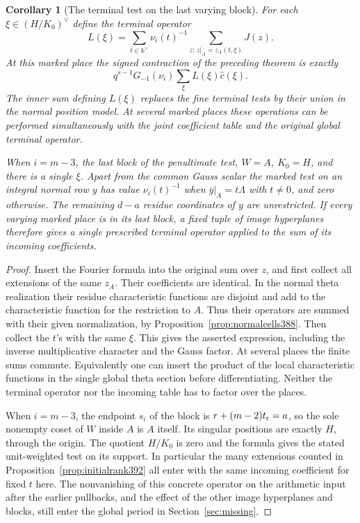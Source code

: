 \documentclass[a4paper,11pt]{article}
\newtheorem{corollary}[proposition]{Corollary}
\theoremstyle{definition}
\theoremstyle{remark}
\numberwithin{equation}{section}
\begin{document}
\begin{corollary}[The terminal test on the last varying block]
\label{cor:lastblock393}
For each \(\xi\in(H/K_0)^\vee\) define the terminal operator
\[
 L(\xi)=\sum_{t\in k^\times}\nu_i(t)^{-1}
                \sum_{z:\,z|_A=z_A(t,\xi)}J(z).
\]
At this marked place the signed contraction of the preceding
theorem is exactly
\[
          q^{s-1}G_{-1}(\nu_i)\sum_{\xi} L(\xi)\widehat c(\xi).
\]
The inner sum defining \(L(\xi)\) replaces the fine terminal
tests by their union in the normal position model. At several
marked places these operations can be performed simultaneously
with the joint coefficient table and the original global
terminal operator.

When \(i=m-3\), the last block of the penultimate test,
\(W=A\), \(K_0=H\), and there is a single \(\xi\). Apart
from the common Gauss scalar the marked test on an
integral normal row \(y\) has value
\(\nu_i(t)^{-1}\) when \(\bar y|_A=t\Lambda\) with
\(t\ne0\), and zero otherwise. The remaining \(d-a\)
residue coordinates of \(y\) are unrestricted. If every
varying marked place is in its last block, a fixed tuple of
image hyperplanes therefore gives a single prescribed terminal
operator applied to the sum of its incoming coefficients.
\end{corollary}
\begin{proof}
Insert the Fourier formula into the original sum over \(z\),
and first collect all extensions of the same \(z_A\).
Their coefficients are identical. In the normal theta
realization their residue characteristic functions are disjoint
and add to the characteristic function for the restriction
to \(A\). Thus their operators are summed with their given
normalization, by Proposition~\ref{prop:normalcells388}.
Then collect the \(t\)'s with the same \(\xi\). This gives
the asserted expression, including the inverse multiplicative
character and the Gauss factor. At several places the finite
sums commute. Equivalently one can insert the product of the
local characteristic functions in the single global theta
section before differentiating. Neither the terminal operator
nor the incoming table has to factor over the places.

When \(i=m-3\), the endpoint \(s_i\) of the block is
\(r+(m-2)t_{\rm r}=a\), so the sole nonempty coset of
\(W\) inside \(A\) is \(A\) itself. Its singular positions
are exactly \(H\), through the origin. The quotient \(H/K_0\)
is zero and the formula gives the stated unit-weighted test
on its support. In particular the many extensions counted
in Proposition~\ref{prop:initialrank392} all enter with the
same incoming coefficient for fixed \(t\) here. The
nonvanishing of this concrete operator on the arithmetic
input after the earlier pullbacks, and the effect of the
other image hyperplanes and blocks, still enter the global
period in Section~\ref{sec:missing}.
\end{proof}
\end{document}
